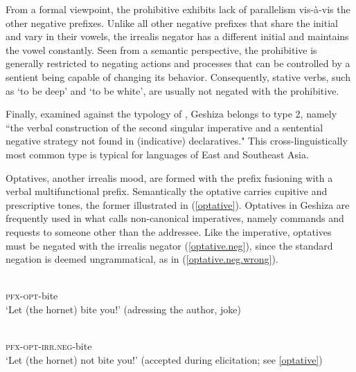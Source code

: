 \documentclass[output=paper,colorlinks,citecolor=brown]{langscibook}
\begin{document}
From a formal viewpoint, the prohibitive exhibits lack of parallelism vis-à-vis the other negative prefixes. Unlike all  other negative prefixes that share the initial  and vary in their vowels, the irrealis negator has a different initial and maintains the vowel  constantly. Seen from a semantic perspective, the prohibitive is generally restricted to negating actions and processes that can be controlled by a sentient being capable of changing its behavior. Consequently, stative verbs, such as  `to be deep' and  `to be white', are usually not negated with the prohibitive.

Finally, examined against the typology of \citet{AuweraEtAl2013}, Geshiza belongs to type 2, namely ``the verbal construction of the second singular imperative and a sentential negative strategy not found in (indicative) declaratives." This cross-linguistically most common type is  typical for languages of East and Southeast Asia. 

Optatives, another irrealis mood, are formed with the prefix  fusioning with a verbal multifunctional prefix. Semantically the optative carries cupitive and prescriptive tones, the former illustrated in (\ref{optative}). Optatives in Geshiza are frequently used in what \citet{Aikhenvald2010} calls non-canonical imperatives, namely commands and requests to someone other than the addressee. Like the imperative, optatives must be negated with the irrealis negator (\ref{optative.neg}), since the standard negation is deemed ungrammatical, as in (\ref{optative.neg.wrong}).

\ea
\label{optative}
\\  
       \textsc{pfx}-\textsc{opt}-bite\\ 
\glt `Let (the hornet) bite you!' (adressing the author, joke)
\z

\ea
\label{optative.neg}
\\  
       \textsc{pfx}-\textsc{opt}-\textsc{irr.neg}-bite\\ 
\glt `Let (the hornet) not bite you!' (accepted during elicitation; see \ref{optative})
\z

\z
\end{document}
